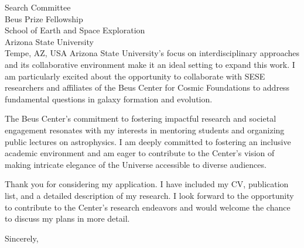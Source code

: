 \documentclass[11pt]{letter}
\begin{document}
\begin{letter}{Search Committee \\ Beus Prize Fellowship \\ School of Earth and Space Exploration \\ Arizona State University \\ Tempe, AZ, USA}
Arizona State University's focus on interdisciplinary approaches and its collaborative environment make it an ideal setting to expand this work. I am particularly excited about the opportunity to collaborate with SESE researchers and affiliates of the Beus Center for Cosmic Foundations to address fundamental questions in galaxy formation and evolution.

The Beus Center's commitment to fostering impactful research and societal engagement resonates with my interests in mentoring students and organizing public lectures on astrophysics. I am deeply committed to fostering an inclusive academic environment and am eager to contribute to the Center's vision of making intricate elegance of the Universe accessible to diverse audiences.

Thank you for considering my application. I have included my CV, publication list, and a detailed description of my research. I look forward to the opportunity to contribute to the Center's research endeavors and would welcome the chance to discuss my plans in more detail.

\closing{Sincerely,}

\end{letter}
\end{document}
